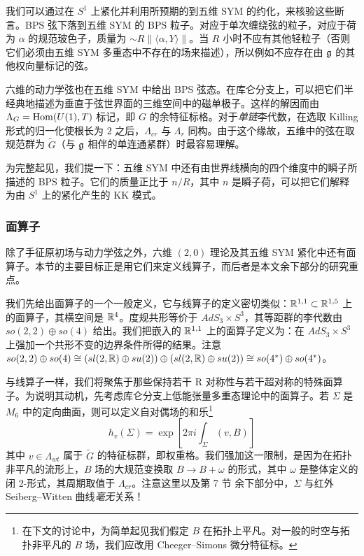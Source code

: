 我们可以通过在 $S^1$ 上紧化并利用所预期的到五维 SYM 的约化，来核验这些断言。BPS 弦下落到五维 SYM 的 BPS 粒子。对应于单次缠绕弦的粒子，对应于荷为 $\alpha$ 的规范玻色子，质量为 $\sim R \lVert \langle \alpha, Y\rangle \rVert$。当 $R$ 小时不应有其他轻粒子（否则它们必须由五维 SYM 多重态中不存在的场来描述），所以例如不应存在由 $\mathfrak{g}$ 的其他权向量标记的弦。

六维的动力学弦也在五维 SYM 中给出 BPS 弦态。在库仑分支上，可以把它们半经典地描述为垂直于弦世界面的三维空间中的磁单极子。这样的解因而由 $\Lambda_{G} = {\rm Hom}(U(1),T)$ 标记，即 $G$ 的余特征标格。对于\emph{单链}李代数，在选取 Killing 形式的归一化使根长为 $2$ 之后，$\Lambda_{cr}$ 与 $\Lambda_{r}$ 同构。由于这个缘故，五维中的弦在取规范群为 $\tilde G$（与 $\mathfrak{g}$ 相伴的单连通紧群）时最容易理解。

为完整起见，我们提一下：五维 SYM 中还有由世界线横向的四个维度中的瞬子所描述的 BPS 粒子。它们的质量正比于 $n/R$，其中 $n$ 是瞬子荷，可以把它们解释为由 $S^1$ 上的紧化产生的 KK 模式。


\subsubsection{面算子}

除了手征原初场与动力学弦之外，六维 $(2,0)$ 理论及其五维 SYM 紧化中还有面算子。本节的主要目标正是用它们来定义线算子，而后者是本文余下部分的研究重点。

我们先给出面算子的一个一般定义，它与线算子的定义密切类似：$\mathbb{R}^{1,1}\subset\mathbb{R}^{1,5}$ 上的面算子，其横空间是 $\mathbb{R}^4$。度规共形等价于 $AdS_3\times S^3$，其等距群的李代数由 $so(2,2)\oplus so(4)$ 给出。我们把嵌入的 $\mathbb{R}^{1,1}$ 上的面算子定义为：在 $AdS_3\times S^3$ 上强加一个共形不变的边界条件所得的结果。注意 $so(2,2)\oplus so(4) \cong (sl(2,\mathbb{R}) \oplus su(2)) \oplus (sl(2,\mathbb{R}) \oplus su(2))\cong so(4^*) \oplus so(4^*)$。

与线算子一样，我们将聚焦于那些保持若干 R 对称性与若干超对称的特殊面算子。为说明其动机，先考虑库仑分支上低能张量多重态理论中的面算子。若 $\Sigma$ 是 $M_6$ 中的定向曲面，则可以定义自对偶场的和乐\footnote{在下文的讨论中，为简单起见我们假定 $B$ 在拓扑上平凡。对一般的时空与拓扑非平凡的 $B$ 场，我们应改用 Cheeger--Simons 微分特征标。}
\begin{equation}\label{eq:self-dual-holon}
h_v(\Sigma) = \exp[ 2\pi i \int_{\Sigma} (v, B) ]
\end{equation}
其中 $v \in \Lambda_{wt}$ 属于 $\tilde G$ 的特征标群，即权重格。我们强加这一限制，是因为在拓扑非平凡的流形上，$B$ 场的大规范变换取 $B \to B + \omega$ 的形式，其中 $\omega$ 是整体定义的闭 2-形式，其周期取值于 $\Lambda_{cr}$。注意这里以及第 7 节%
余下部分中，$\Sigma$ 与红外 Seiberg--Witten 曲线\emph{毫无}关系！

